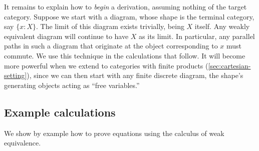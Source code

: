 \documentclass[11pt]{article}
\numberwithin{equation}{section}
\begin{document}
It remains to explain how to \emph{begin} a derivation, assuming nothing of the
target category. Suppose we start with a  diagram, whose shape
is the terminal category, say $\{x: X\}$. The limit of this diagram exists
trivially, being $X$ itself. Any weakly equivalent diagram will continue to have
$X$ as its limit. In particular, any parallel paths in such a diagram that
originate at the object corresponding to $x$ must commute. We use this technique
in the calculations that follow. It will become more powerful when we extend to
categories with finite products (\cref{sec:cartesian-setting}), since we can
then start with any finite discrete diagram, the shape's generating objects
acting as ``free variables.''

\subsection{Example calculations}

We show by example how to prove equations using the calculus of weak
equivalence.
\end{document}
